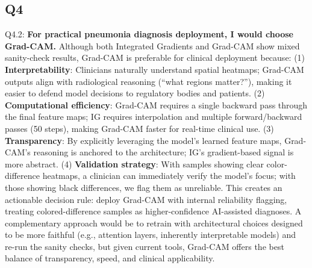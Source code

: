 \subsection*{Q4}
Q4.2: \textbf{For practical pneumonia diagnosis deployment, I would choose Grad-CAM.} Although both Integrated Gradients and Grad-CAM show mixed sanity-check results, Grad-CAM is preferable for clinical deployment because: (1) \textbf{Interpretability}: Clinicians naturally understand spatial heatmaps; Grad-CAM outputs align with radiological reasoning (``what regions matter?''), making it easier to defend model decisions to regulatory bodies and patients. (2) \textbf{Computational efficiency}: Grad-CAM requires a single backward pass through the final feature maps; IG requires interpolation and multiple forward/backward passes (50 steps), making Grad-CAM faster for real-time clinical use. (3) \textbf{Transparency}: By explicitly leveraging the model's learned feature maps, Grad-CAM's reasoning is anchored to the architecture; IG's gradient-based signal is more abstract. (4) \textbf{Validation strategy}: With samples showing clear color-difference heatmaps, a clinician can immediately verify the model's focus; with those showing black differences, we flag them as unreliable. This creates an actionable decision rule: deploy Grad-CAM with internal reliability flagging, treating colored-difference samples as higher-confidence AI-assisted diagnoses. A complementary approach would be to retrain with architectural choices designed to be more faithful (e.g., attention layers, inherently interpretable models) and re-run the sanity checks, but given current tools, Grad-CAM offers the best balance of transparency, speed, and clinical applicability.
